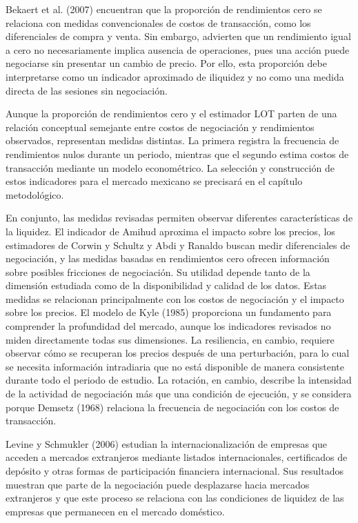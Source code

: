 Bekaert et al. (2007) encuentran que la proporción de rendimientos cero se relaciona con medidas convencionales de costos de transacción, como los diferenciales de compra y venta. Sin embargo, advierten que un rendimiento igual a cero no necesariamente implica ausencia de operaciones, pues una acción puede negociarse sin presentar un cambio de precio. Por ello, esta proporción debe interpretarse como un indicador aproximado de iliquidez y no como una medida directa de las sesiones sin negociación.

Aunque la proporción de rendimientos cero y el estimador LOT parten de una relación conceptual semejante entre costos de negociación y rendimientos observados, representan medidas distintas. La primera registra la frecuencia de rendimientos nulos durante un periodo, mientras que el segundo estima costos de transacción mediante un modelo econométrico. La selección y construcción de estos indicadores para el mercado mexicano se precisará en el capítulo metodológico.

En conjunto, las medidas revisadas permiten observar diferentes características de la liquidez. El indicador de Amihud aproxima el impacto sobre los precios, los estimadores de Corwin y Schultz y Abdi y Ranaldo buscan medir diferenciales de negociación, y las medidas basadas en rendimientos cero ofrecen información sobre posibles fricciones de negociación. Su utilidad depende tanto de la dimensión estudiada como de la disponibilidad y calidad de los datos. Estas medidas se relacionan principalmente con los costos de negociación y el impacto sobre los precios. El modelo de Kyle (1985) proporciona un fundamento para comprender la profundidad del mercado, aunque los indicadores revisados no miden directamente todas sus dimensiones. La resiliencia, en cambio, requiere observar cómo se recuperan los precios después de una perturbación, para lo cual se necesita información intradiaria que no está disponible de manera consistente durante todo el periodo de estudio. La rotación, en cambio, describe la intensidad de la actividad de negociación más que una condición de ejecución, y se considera porque Demsetz (1968) relaciona la frecuencia de negociación con los costos de transacción.


Levine y Schmukler (2006) estudian la internacionalización de empresas que acceden a mercados extranjeros mediante listados internacionales, certificados de depósito y otras formas de participación financiera internacional. Sus resultados muestran que parte de la negociación puede desplazarse hacia mercados extranjeros y que este proceso se relaciona con las condiciones de liquidez de las empresas que permanecen en el mercado doméstico.

